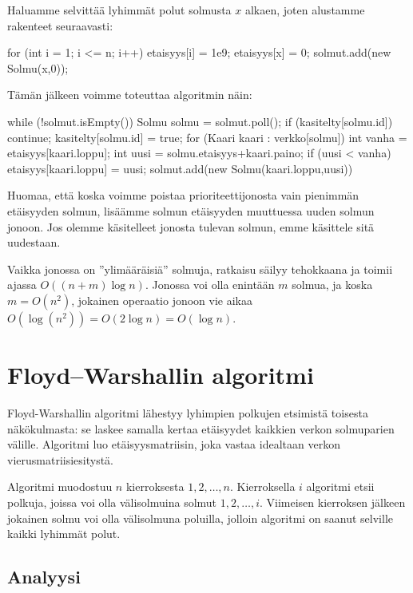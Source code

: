 Haluamme selvittää lyhimmät polut solmusta $x$ alkaen,
joten alustamme rakenteet seuraavasti:

\begin{code}
for (int i = 1; i <= n; i++) {
    etaisyys[i] = 1e9;
}
etaisyys[x] = 0;
solmut.add(new Solmu(x,0));
\end{code}

Tämän jälkeen voimme toteuttaa algoritmin näin:

\begin{code}
while (!solmut.isEmpty()) {
    Solmu solmu = solmut.poll();
    if (kasitelty[solmu.id]) continue;
    kasitelty[solmu.id] = true;
    for (Kaari kaari : verkko[solmu]) {
        int vanha = etaisyys[kaari.loppu];
        int uusi = solmu.etaisyys+kaari.paino;
        if (uusi < vanha) {
            etaisyys[kaari.loppu] = uusi;
            solmut.add(new Solmu(kaari.loppu,uusi))
        }
    }
}
\end{code}

Huomaa, että koska voimme poistaa prioriteettijonosta
vain pienimmän etäisyyden solmun,
lisäämme solmun etäisyyden muuttuessa uuden solmun jonoon.
Jos olemme käsitelleet jonosta tulevan solmun,
emme käsittele sitä uudestaan.

Vaikka jonossa on ''ylimääräisiä'' solmuja, ratkaisu säilyy
tehokkaana ja toimii ajassa $O((n+m) \log n)$.
Jonossa voi olla enintään $m$ solmua, ja koska $m=O(n^2)$,
jokainen operaatio jonoon vie aikaa $O(\log (n^2))=O(2 \log n)=O(\log n)$.

\section{Floyd–Warshallin algoritmi}

Floyd-Warshallin algoritmi lähestyy lyhimpien polkujen etsimistä
toisesta näkökulmasta: se laskee samalla kertaa etäisyydet
kaikkien verkon solmuparien välille.
Algoritmi luo etäisyysmatriisin, joka vastaa idealtaan verkon
vierusmatriisiesitystä.

Algoritmi muodostuu $n$ kierroksesta $1,2,\dots,n$.
Kierroksella $i$ algoritmi etsii polkuja, joissa voi olla
välisolmuina solmut $1,2,\dots,i$.
Viimeisen kierroksen jälkeen jokainen solmu voi olla
välisolmuna poluilla, jolloin algoritmi on saanut selville
kaikki lyhimmät polut.

\subsection{Analyysi}

